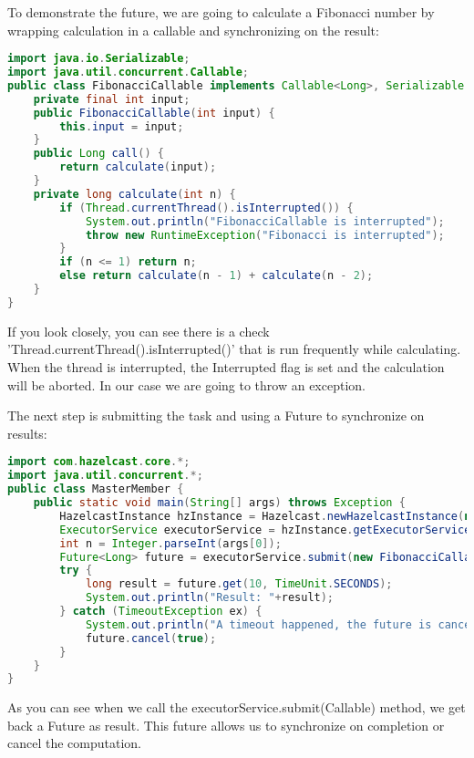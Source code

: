 To demonstrate the future, we are going to calculate a Fibonacci number by wrapping calculation in a callable and synchronizing on the result:
\begin{lstlisting}[language=java]
import java.io.Serializable;
import java.util.concurrent.Callable;
public class FibonacciCallable implements Callable<Long>, Serializable {
    private final int input;
    public FibonacciCallable(int input) {
        this.input = input;
    }
    public Long call() {
        return calculate(input);
    }
    private long calculate(int n) {
        if (Thread.currentThread().isInterrupted()) {
            System.out.println("FibonacciCallable is interrupted");
            throw new RuntimeException("Fibonacci is interrupted");
        }
        if (n <= 1) return n;
        else return calculate(n - 1) + calculate(n - 2);
    }
}
\end{lstlisting}
If you look closely, you can see there is a check 'Thread.currentThread().isInterrupted()' that is run frequently while calculating. When the thread is interrupted, the Interrupted flag is set and the calculation will be aborted. In our case we are going to throw an exception.

The next step is submitting the task and using a Future to synchronize on results:
\begin{lstlisting}[language=java]
import com.hazelcast.core.*;
import java.util.concurrent.*;
public class MasterMember {
    public static void main(String[] args) throws Exception {
        HazelcastInstance hzInstance = Hazelcast.newHazelcastInstance(null);
        ExecutorService executorService = hzInstance.getExecutorService();
        int n = Integer.parseInt(args[0]);
        Future<Long> future = executorService.submit(new FibonacciCallable(n));
        try {
            long result = future.get(10, TimeUnit.SECONDS);
            System.out.println("Result: "+result);
        } catch (TimeoutException ex) {
            System.out.println("A timeout happened, the future is cancelled");
            future.cancel(true);
        }
    }
}
\end{lstlisting}
As you can see when we call the executorService.submit(Callable) method, we get back a Future as result. This future allows us to synchronize on completion or cancel the computation. 

